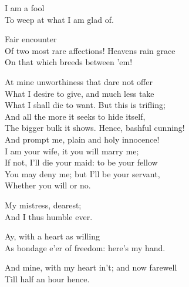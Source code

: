 \begin{verse_speech}[Miranda] 
I am a fool\\
To weep at what I am glad of.
\end{verse_speech}

\begin{verse_speech}[Prospero] 
Fair encounter\\
Of two most rare affections! Heavens rain grace\\
On that which breeds between 'em!
\end{verse_speech}


\begin{verse_speech}[Miranda] 
At mine unworthiness that dare not offer\\
What I desire to give, and much less take\\
What I shall die to want. But this is trifling;\\
And all the more it seeks to hide itself,\\
The bigger bulk it shows. Hence, bashful cunning!\\
And prompt me, plain and holy innocence!\\
I am your wife, it you will marry me;\\
If not, I'll die your maid: to be your fellow\\
You may deny me; but I'll be your servant,\\
Whether you will or no.
\end{verse_speech}

\begin{verse_speech}[Ferdinand] 
My mistress, dearest;\\
And I thus humble ever.
\end{verse_speech}


\begin{verse_speech}[Ferdinand] 
Ay, with a heart as willing\\
As bondage e'er of freedom: here's my hand.
\end{verse_speech}

\begin{verse_speech}[Miranda] 
And mine, with my heart in't; and now farewell\\
Till half an hour hence.
\end{verse_speech}


